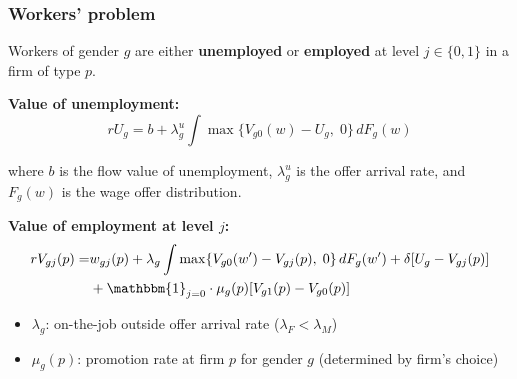 \documentclass[aspectratio=169, 11pt]{beamer}
\begin{document}
\begin{frame}
\frametitle{Workers' problem}

Workers of gender $g$ are either \textbf{unemployed} or \textbf{employed} at level $j \in \{0,1\}$ in a firm of type $p$.

\vspace{0.3cm}
\textbf{Value of unemployment:}
\begin{equation*}
    rU_g = b + \lambda_g^u \int \max\{V_{g0}(w) - U_g,\; 0\} \, dF_g(w)
\end{equation*}

where $b$ is the flow value of unemployment, $\lambda_g^u$ is the offer arrival rate, and $F_g(w)$ is the wage offer distribution.

\vspace{0.3cm}
\textbf{Value of employment at level $j$:}
\begin{align*}
    rV_{gj}(p) = & w_{gj}(p) + \lambda_g \int \max\{V_{g0}(w') - V_{gj}(p),\; 0\} \, dF_g(w') + \delta[U_g - V_{gj}(p)] \\ 
    & + \mathbbm{1}_{j=0} \cdot \mu_g(p)[V_{g1}(p) - V_{g0}(p)] %
\end{align*}

\begin{itemize}
    \item $\lambda_g$: on-the-job outside offer arrival rate (\textbf{$\lambda_F < \lambda_M$})
    \item $\mu_g(p)$: promotion rate at firm $p$ for gender $g$ (determined by firm's choice)
\end{itemize}

\end{frame}
\end{document}
